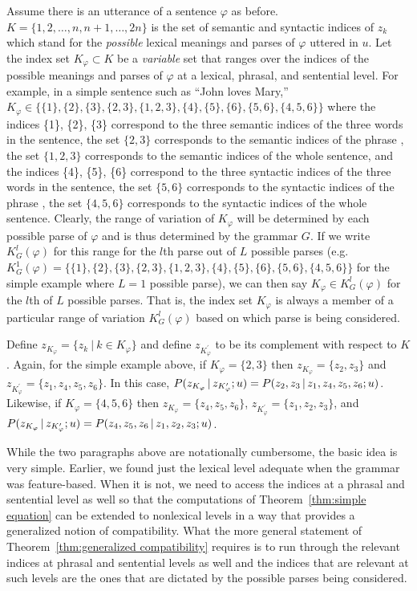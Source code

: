 Assume there is an utterance of a sentence $\varphi$ as before. $K = \{1, 2, \ldots, n, n + 1, \ldots, 2n\}$ is the set of semantic and syntactic indices of $z_k$ which stand for the \emph{possible} lexical meanings and parses of $\varphi$ uttered in $u$. Let the index set $K_{\varphi} \subset K$ be a \emph{variable} set that ranges over the indices of the possible meanings and parses of $\varphi$ at a lexical, phrasal, and sentential level. For example, in a simple sentence such as ``John loves Mary,'' $K_{\varphi} \in \{ \{1\}, \{2\}, \{3\}, \{2, 3\}, \{1, 2, 3\}, \{4\}, \{5\}, \{6\}, \{5, 6\},\allowbreak \{4, 5,\allowbreak 6\} \}$ where the indices \{1\}, \{2\}, \{3\} correspond to the three semantic indices of the three words in the sentence, the set $\{2, 3\}$ corresponds to the semantic indices of the phrase , the set $\{1, 2, 3\}$ corresponds to the semantic indices of the whole sentence, and the indices \{4\}, \{5\}, \{6\} correspond to the three syntactic indices of the three words in the sentence, the set $\{5, 6\}$ corresponds to the syntactic indices of the phrase , the set $\{4, 5, 6\}$ corresponds to the syntactic indices of the whole sentence. Clearly, the range of variation of $K_\varphi$ will be determined by each possible parse of $\varphi$ and is thus determined by the grammar $G$. If we write $K^l_G(\varphi)$ for this range for the $l$th parse out of $L$ possible parses (e.g.\ $K^1_G(\varphi) = \{ \{1\}, \{2\}, \{3\}, \{2, 3\}, \{1, 2, 3\}, \{4\}, \{5\}, \{6\}, \{5, 6\}, \{4, 5, 6\} \}$ for the simple example where $L = 1$ possible parse), we can then say $K_\varphi \in K^l_G(\varphi)$ for the $l$th of $L$ possible parses. That is, the index set $K_\varphi$ is always a member of a particular range of variation $K^l_G(\varphi)$ based on which parse is being considered.

Define $z_{K_\varphi} = \{z_{k}\ |\ k \in K_\varphi\}$ and define $z_{K_\varphi^\prime}$ to be its complement with respect to $K$. Again, for the simple example above, if $K_\varphi = \{2, 3\}$ then $z_{K_\varphi} = \{z_2, z_3\}$ and $z_{K_\varphi^\prime} = \{z_1, z_4, z_5, z_6\}$. In this case, $P(z_{K_\varphi} \,|\, z_{K_\varphi^\prime}; u) = P(z_2, z_3 \,|\, z_1, z_4, z_5, z_6; u)$. Likewise, if $K_\varphi = \{4, 5, 6\}$ then $z_{K_\varphi} = \{z_4, z_5, z_6\}$, $z_{K_\varphi^\prime} = \{z_1, z_2, z_3\}$, and $P(z_{K_\varphi} \,|\, z_{K_\varphi^\prime}; u)\allowbreak = P(z_4, z_5, z_6 \,|\, z_1, z_2, z_3; u)$.

While the two paragraphs above are notationally cumbersome, the basic idea is very simple. Earlier, we found just the lexical level adequate when the grammar was feature-based. When it is not, we need to access the indices at a phrasal and sentential level as well so that the computations of Theorem~\ref{thm:simple equation} can be extended to nonlexical levels in a way that provides a generalized notion of compatibility. What the more general statement of Theorem~\ref{thm:generalized compatibility} requires is to run through the relevant indices at phrasal and sentential levels as well and the indices that are relevant at such levels are the ones that are dictated by the possible parses being considered.

